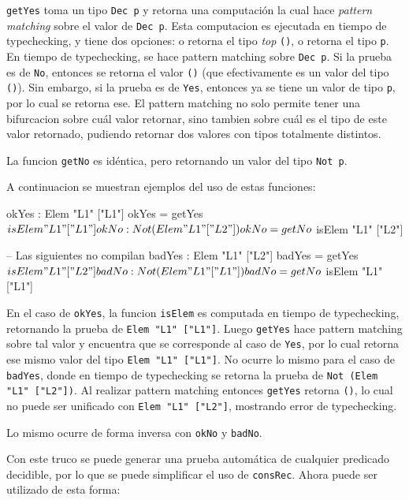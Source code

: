 \texttt{getYes} toma un tipo \texttt{Dec p} y retorna una computación la cual hace \textit{pattern matching} sobre el valor de \texttt{Dec p}. Esta computacion es ejecutada en tiempo de typechecking, y tiene dos opciones: o retorna el tipo \textit{top} \texttt{()}, o retorna el tipo \texttt{p}.
En tiempo de typechecking, se hace pattern matching sobre \texttt{Dec p}. Si la prueba es de \texttt{No}, entonces se retorna el valor \texttt{()} (que efectivamente es un valor del tipo \texttt{()}). Sin embargo, si la prueba es de \texttt{Yes}, entonces ya se tiene un valor de tipo \texttt{p}, por lo cual se retorna ese. El pattern matching no solo permite tener una bifurcacion sobre cuál valor retornar, sino tambien sobre cuál es el tipo de este valor retornado, pudiendo retornar dos valores con tipos totalmente distintos.

La funcion \texttt{getNo} es idéntica, pero retornando un valor del tipo \texttt{Not p}.

A continuacion se muestran ejemplos del uso de estas funciones:

\begin{code}
okYes : Elem "L1" ["L1"]
okYes = getYes $ isElem "L1" ["L1"]

okNo : Not (Elem "L1" ["L2"])
okNo = getNo $ isElem "L1" ["L2"]

-- Las siguientes no compilan
badYes : Elem "L1" ["L2"]
badYes = getYes $ isElem "L1" ["L2"]

badNo : Not (Elem "L1" ["L1"])
badNo = getNo $ isElem "L1" ["L1"]
\end{code}

En el caso de \texttt{okYes}, la funcion \texttt{isElem} es computada en tiempo de typechecking, retornando la prueba de \texttt{Elem "L1" ["L1"]}. Luego \texttt{getYes} hace pattern matching sobre tal valor y encuentra que se corresponde al caso de \texttt{Yes}, por lo cual retorna ese mismo valor del tipo \texttt{Elem "L1" ["L1"]}. No ocurre lo mismo para el caso de \texttt{badYes}, donde en tiempo de typechecking se retorna la prueba de \texttt{Not (Elem "L1" ["L2"])}. Al realizar pattern matching entonces \texttt{getYes} retorna \texttt{()}, lo cual no puede ser unificado con \texttt{Elem "L1" ["L2"]}, mostrando error de typechecking.

Lo mismo ocurre de forma inversa con \texttt{okNo} y \texttt{badNo}.

Con este truco se puede generar una prueba automática de cualquier predicado decidible, por lo que se puede simplificar el uso de \texttt{consRec}.
Ahora puede ser utilizado de esta forma:

